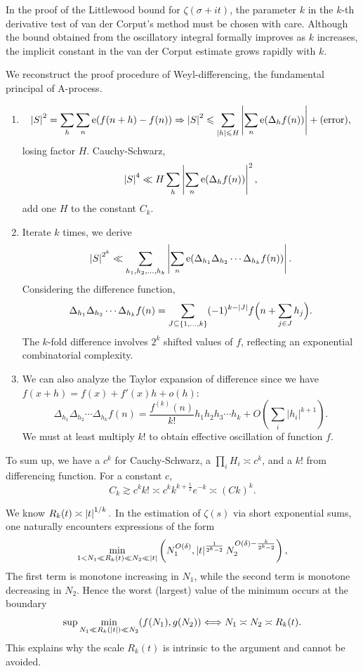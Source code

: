 \begin{remark}
In the proof of the Littlewood bound for $\zeta(\sigma+it)$, the parameter $k$ in the $k$-th derivative test of van der Corput's method must be chosen with care. 
Although the bound obtained from the oscillatory integral formally improves as $k$ increases, the implicit constant in the van der Corput estimate grows rapidly with $k$.

We reconstruct the proof procedure of Weyl-differencing, the fundamental principal of A-process. 
\begin{enumerate}
    \item $$\left\lvert S \right\rvert^2 = \sum_{h} \sum_{n} \operatorname{e} \! \left( f(n+h)-f(n) \right) \Rightarrow \left\lvert S \right\rvert^2 \leqslant \sum_{|h|\leqslant H} \left\lvert \sum_{n} \operatorname{e} \! \left( \Delta_h f(n) \right) \right\rvert + \text{(error)},$$ losing factor $H$. Cauchy-Schwarz, $$\left\lvert S \right\rvert^4 \ll H \sum_h \left\lvert \sum_n \operatorname{e} \! \left( \Delta_h f(n) \right) \right\rvert^2,$$ add one $H$ to the constant $C_k$.
    \item Iterate $k$ times, we derive $$\left\lvert S \right\rvert^{2^k} \ll \sum_{h_1,h_2,\dots,h_k} \left\lvert \sum_n \operatorname{e} \! \left( \Delta_{h_1} \Delta_{h_2} \cdots \Delta_{h_k} f(n) \right) \right\rvert.$$ Considering the difference function, $$\Delta_{h_1} \Delta_{h_2} \cdots \Delta_{h_k} f(n) = \sum_{J\subseteq\{1,\dots,k\}} (-1)^{k-|J|} f\Bigl(n+\sum_{j\in J} h_j\Bigr).$$ The $k$-fold difference involves $2^k$ shifted values of $f$, reflecting an exponential combinatorial complexity.
    \item We can also analyze the Taylor expansion of difference since we have $f(x+h) = f(x) + f'(x)h +o(h)$: $$\Delta_{h_1} \Delta_{h_2} \cdots \Delta_{h_k} f(n) = \frac{f^{(k)}(n)}{k!}h_1h_2h_3\cdots h_k + O\left(\sum_i |h_i|^{k+1}\right).$$ We must at least multiply $k!$ to obtain effective oscillation of function $f$.
\end{enumerate}
To sum up, we have a $c^k$ for Cauchy-Schwarz, a $\prod_i H_i \asymp c^k$, and a $k!$ from differencing function. For a constant $c$, 
\begin{equation}
    C_k \gtrsim c^k k! \asymp c^k k^{k+\frac{1}{2}} e^{-k} \asymp (Ck)^k.
\end{equation}
\end{remark}

\begin{remark}
We know $R_k(t) \asymp \left\lvert t \right\rvert^{1/k}.$ In the estimation of $\zeta(s)$ via short exponential sums, one naturally encounters expressions of the form
$$\min_{1 < N_1 \ll R_k(t) \ll N_2 \ll \left\lvert t \right\rvert} \left( N_1^{O(\delta)}, \left\lvert t \right\rvert^{\frac{1}{2^k-2}} N_2^{O(\delta)-\frac{k}{2^k-2}} \right),$$
The first term is monotone increasing in $N_1$, while the second term is monotone decreasing in $N_2$. 
Hence the worst (largest) value of the minimum occurs at the boundary
$$ \sup \min_{N_1 \ll R_k(\left\lvert t \right\rvert) \ll N_2} (f(N_1), g(N_2)) \Longleftrightarrow N_1 \asymp N_2 \asymp R_k(t).$$ This explains why the scale $R_k(t)$ is intrinsic to the argument and cannot be avoided.
\end{remark}

